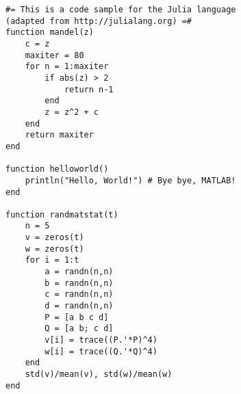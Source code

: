 \documentclass{article}
\begin{document}
\begin{lstlisting}
#= This is a code sample for the Julia language
(adapted from http://julialang.org) =#
function mandel(z)
    c = z
    maxiter = 80
    for n = 1:maxiter
        if abs(z) > 2
            return n-1
        end
        z = z^2 + c
    end
    return maxiter
end

function helloworld()
    println("Hello, World!") # Bye bye, MATLAB!
end

function randmatstat(t)
    n = 5
    v = zeros(t)
    w = zeros(t)
    for i = 1:t
        a = randn(n,n)
        b = randn(n,n)
        c = randn(n,n)
        d = randn(n,n)
        P = [a b c d]
        Q = [a b; c d]
        v[i] = trace((P.'*P)^4)
        w[i] = trace((Q.'*Q)^4)
    end
    std(v)/mean(v), std(w)/mean(w)
end
\end{lstlisting}
\end{document}
